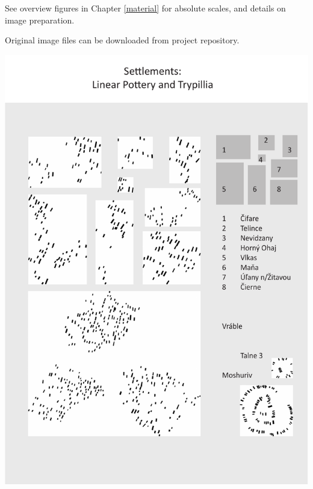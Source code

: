 \documentclass[
  12pt,
  a4paper, twoside]{book}
\begin{document}
See overview figures in Chapter \ref{material} for absolute scales, and details on image preparation.

Original image files can be downloaded from project repository.

\newpage

\begin{center}\includegraphics[width=1\linewidth]{Appendix/settlements} \end{center}

\newpage
\end{document}
